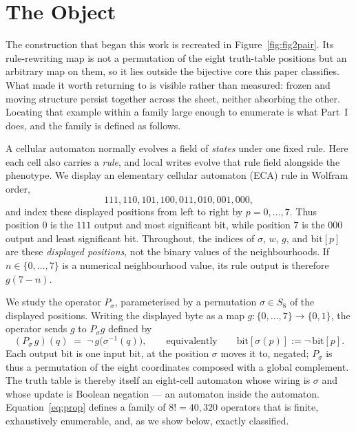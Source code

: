 \documentclass[man,12pt,floatsintext,donotrepeattitle]{apa7}
\newcommand{\sig}{\sigma}
\newcommand{\bit}[1]{\mathrm{bit}[#1]}
\begin{document}
\section{The Object}
\label{sec:object}

The construction that began this work is recreated in Figure~\ref{fig:fig2pair}. Its
rule-rewriting map is not a permutation of the eight truth-table positions but an
arbitrary map on them, so it lies outside the bijective core this paper classifies. What
made it worth returning to is visible rather than measured: frozen and moving structure
persist together across the sheet, neither absorbing the other. Locating that example
within a family large enough to enumerate is what Part~I does, and the family is
defined as follows.

A cellular automaton normally evolves a field of \emph{states} under one
fixed rule. Here each cell also carries a \emph{rule}, and local writes evolve
that rule field alongside the phenotype. We display an elementary cellular
automaton (ECA) rule in Wolfram order,
\[
111,110,101,100,011,010,001,000,
\]
and index these displayed positions from left to right by $p=0,\ldots,7$.
Thus position $0$ is the $111$ output and most significant bit, while position
$7$ is the $000$ output and least significant bit. Throughout, the indices of
$\sig$, $w$, $g$, and $\bit{p}$ are these \emph{displayed positions}, not the
binary values of the neighbourhoods. If $n\in\{0,\ldots,7\}$ is a numerical
neighbourhood value, its rule output is therefore $g(7-n)$.

We study the operator $P_\sig$, parameterised by a permutation
$\sig\in S_8$ of the displayed positions. Writing the displayed byte as a map
$g\colon\{0,\dots,7\}\to\{0,1\}$, the operator sends $g$ to $P_\sig g$ defined by
\begin{equation}
(P_\sig\, g)(q) \;=\; \lnot\, g\bigl(\sig^{-1}(q)\bigr),
\qquad\text{equivalently}\qquad \bit{\sig(p)} := \lnot\,\bit{p}.
\label{eq:prop}
\end{equation}
Each output bit is one input bit, at the position $\sig$ moves it to, negated;
$P_\sig$ is thus a permutation of the eight coordinates composed with a global
complement. The truth table is thereby itself an eight-cell automaton whose
wiring is $\sig$ and whose update is Boolean negation --- an automaton inside
the automaton. Equation~\eqref{eq:prop} defines a family of $8! = 40{,}320$
operators that is finite, exhaustively enumerable, and, as we show below,
exactly classified.
\end{document}

